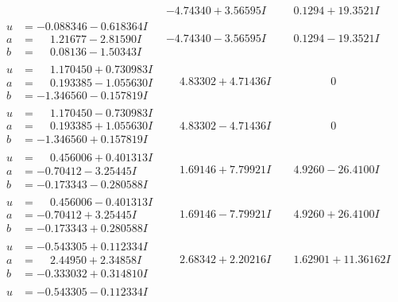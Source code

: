 \documentclass[1p]{elsarticle_modified}
\theoremstyle{definition}
\begin{document}
$$\begin{array}{c|c|c}
 & -4.74340 + 3.56595 I & \phantom{-}0.1294 + 19.3521 I \\ \hline\begin{aligned}
u &= -0.088346 - 0.618364 I \\
a &= \phantom{-}1.21677 - 2.81590 I \\
b &= \phantom{-}0.08136 - 1.50343 I\end{aligned}
 & -4.74340 - 3.56595 I & \phantom{-}0.1294 - 19.3521 I \\ \hline\begin{aligned}
u &= \phantom{-}1.170450 + 0.730983 I \\
a &= \phantom{-}0.193385 - 1.055630 I \\
b &= -1.346560 - 0.157819 I\end{aligned}
 & \phantom{-}4.83302 + 4.71436 I & \phantom{-0.000000 } 0 \\ \hline\begin{aligned}
u &= \phantom{-}1.170450 - 0.730983 I \\
a &= \phantom{-}0.193385 + 1.055630 I \\
b &= -1.346560 + 0.157819 I\end{aligned}
 & \phantom{-}4.83302 - 4.71436 I & \phantom{-0.000000 } 0 \\ \hline\begin{aligned}
u &= \phantom{-}0.456006 + 0.401313 I \\
a &= -0.70412 - 3.25445 I \\
b &= -0.173343 - 0.280588 I\end{aligned}
 & \phantom{-}1.69146 + 7.79921 I & \phantom{-}4.9260 - 26.4100 I \\ \hline\begin{aligned}
u &= \phantom{-}0.456006 - 0.401313 I \\
a &= -0.70412 + 3.25445 I \\
b &= -0.173343 + 0.280588 I\end{aligned}
 & \phantom{-}1.69146 - 7.79921 I & \phantom{-}4.9260 + 26.4100 I \\ \hline\begin{aligned}
u &= -0.543305 + 0.112334 I \\
a &= \phantom{-}2.44950 + 2.34858 I \\
b &= -0.333032 + 0.314810 I\end{aligned}
 & \phantom{-}2.68342 + 2.20216 I & \phantom{-}1.62901 + 11.36162 I \\ \hline\begin{aligned}
u &= -0.543305 - 0.112334 I \\

\end{aligned}
\end{array}$$
\end{document}

